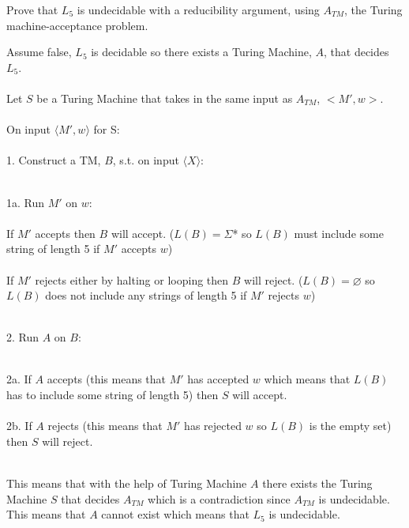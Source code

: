 \documentclass[11pt]{article}
\theoremstyle{definition}
\theoremstyle{theorem}
\newcommand{\solution}{\medskip\noindent{\color{blue}\textbf{Solution:}}}
\begin{document}
Prove that $L_{5}$ is undecidable with a reducibility argument, using $A_{TM}$, the Turing machine-acceptance problem.

\solution

\noindent Assume false, $L_{5}$ is decidable so there exists a Turing Machine, $A$, that decides $L_{5}$. \\~\\
\noindent Let $S$ be a Turing Machine that takes in the same input as $A_{TM}$, $<M', w>$. \\~\\
\noindent On input $\langle M', w \rangle$ for S: \\~\\
\hangindent=0.7cm 1. Construct a TM, $B$, s.t. on input $\langle X \rangle$: \\~\\
\hspace*{0.9cm}
\begin{minipage}{.8\textwidth}
		1a. Run $M'$ on $w$: \\~\\
		\indent If $M'$ accepts then $B$ will accept. ($L(B) = \Sigma$* so $L(B)$ must include some string of length 5 if $M'$ accepts $w$)  \\~\\
		\indent If $M'$ rejects either by halting or looping then $B$ will reject. ($L(B) = \varnothing$ so $L(B)$ does not include any strings of length 5 if $M'$ rejects $w$) \\~\\
\end{minipage}

2. Run $A$ on $B$: \\~\\
\hspace*{0.9cm}
\begin{minipage}{.8\textwidth}
2a. If $A$ accepts (this means that $M'$ has accepted $w$ which means that $L(B)$ has to include some string of length 5) then $S$ will accept. \\~\\
2b. If $A$ rejects (this means that $M'$ has rejected $w$ so $L(B)$ is the empty set) then $S$ will reject. \\~\\
\end{minipage}

\noindent This means that with the help of Turing Machine $A$ there exists the Turing Machine $S$ that decides $A_{TM}$ which is a contradiction since $A_{TM}$ is undecidable. This means that $A$ cannot exist which means that $L_5$ is undecidable.
\end{document}
